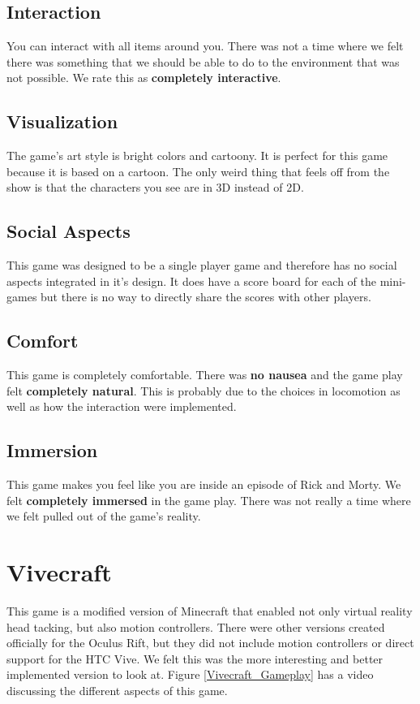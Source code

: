 \documentclass[journal]{IEEEtran}
\begin{document}
\subsection{Interaction}
You can interact with all items around you. There was not a time where we felt there was something that we should be able to do to the environment that was not possible. We rate this as \textbf{completely interactive}.

\subsection{Visualization}
The game's art style is bright colors and cartoony. It is perfect for this game because it is based on a cartoon. The only weird thing that feels off from the show is that the characters you see are in 3D instead of 2D. 
\subsection{Social Aspects}
This game was designed to be a single player game and therefore has no social aspects integrated in it's design. It does have a score board for each of the mini-games but there is no way to directly share the scores with other players. 

\subsection{Comfort}
This game is completely comfortable. There was \textbf{no  nausea} and the game play felt \textbf{completely natural}. This is probably due to the choices in locomotion as well as how the interaction were implemented. 

\subsection{Immersion}
This game makes you feel like you are inside an episode of Rick and Morty. We felt \textbf{completely immersed} in the game play. There was not really a time where we felt pulled out of the game's reality. 

\section{Vivecraft}
This game is a modified version of Minecraft that enabled not only virtual reality head tacking, but also motion controllers. There were other versions created officially for the Oculus Rift, but they did not include motion controllers or direct support for the HTC Vive. We felt this was the more interesting and better implemented version to look at. Figure \ref{Vivecraft_Gameplay} has a video discussing the different aspects of this game. 
\end{document}

